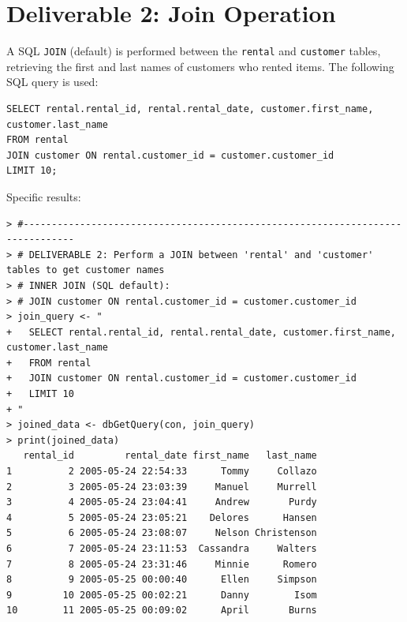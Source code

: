 \documentclass[a4paper,11pt]{extarticle}
\begin{document}
\section*{Deliverable 2: Join Operation}
A SQL \texttt{JOIN} (default) is performed between the \texttt{rental} and \texttt{customer} tables, retrieving the first and last names of customers who rented items. The following SQL query is used:
\begin{verbatim}
SELECT rental.rental_id, rental.rental_date, customer.first_name, customer.last_name
FROM rental
JOIN customer ON rental.customer_id = customer.customer_id
LIMIT 10;
\end{verbatim}
Specific results:
\begin{verbatim}
> #-------------------------------------------------------------------------------
> # DELIVERABLE 2: Perform a JOIN between 'rental' and 'customer' tables to get customer names
> # INNER JOIN (SQL default):
> # JOIN customer ON rental.customer_id = customer.customer_id 
> join_query <- "
+   SELECT rental.rental_id, rental.rental_date, customer.first_name, customer.last_name
+   FROM rental
+   JOIN customer ON rental.customer_id = customer.customer_id
+   LIMIT 10
+ "
> joined_data <- dbGetQuery(con, join_query)
> print(joined_data)
   rental_id         rental_date first_name   last_name
1          2 2005-05-24 22:54:33      Tommy     Collazo
2          3 2005-05-24 23:03:39     Manuel     Murrell
3          4 2005-05-24 23:04:41     Andrew       Purdy
4          5 2005-05-24 23:05:21    Delores      Hansen
5          6 2005-05-24 23:08:07     Nelson Christenson
6          7 2005-05-24 23:11:53  Cassandra     Walters
7          8 2005-05-24 23:31:46     Minnie      Romero
8          9 2005-05-25 00:00:40      Ellen     Simpson
9         10 2005-05-25 00:02:21      Danny        Isom
10        11 2005-05-25 00:09:02      April       Burns
\end{verbatim}
\newpage
\end{document}
